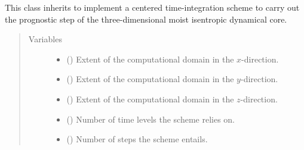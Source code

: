 \documentclass[letterpaper,10pt,english]{sphinxmanual}
\begin{document}
\begin{fulllineitems}
\label{\detokenize{api:dycore.prognostic_isentropic_centered.PrognosticIsentropicCentered}}
This class inherits {\hyperref[\detokenize{api:dycore.prognostic_isentropic.PrognosticIsentropic}]{}} to implement
a centered time-integration scheme to carry out the prognostic step of the three-dimensional
moist isentropic dynamical core.
\begin{quote}\begin{description}
\item[{Variables}] \leavevmode\begin{itemize}
\item {} 
 () \textendash{} Extent of the computational domain in the \(x\)-direction.

\item {} 
 () \textendash{} Extent of the computational domain in the \(y\)-direction.

\item {} 
 () \textendash{} Extent of the computational domain in the \(z\)-direction.

\item {} 
{\hyperref[\detokenize{api:parameterizations.adjustment.Adjustment.time_levels}]{}} () \textendash{} Number of time levels the scheme relies on.

\item {} 
 () \textendash{} Number of steps the scheme entails.

\end{itemize}

\end{description}\end{quote}


\end{fulllineitems}
\end{document}
